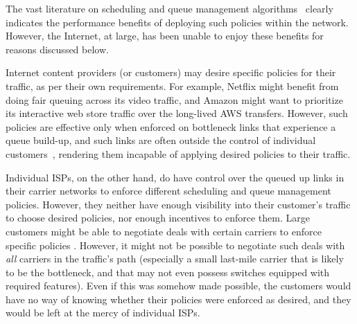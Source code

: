 
The vast literature on scheduling and queue management algorithms~\cite{diffserv, fair-queueing, sfq, pie, CoDel, fifoplus, virtualClocks, csfq, drr, red, ecn} clearly indicates the performance benefits of deploying such policies within the network. However, the Internet, at large, has been unable to enjoy these benefits for reasons discussed below. 

Internet content providers (or customers) may desire specific policies for their traffic, as per their own requirements. For example, Netflix might benefit from doing fair queuing across its video traffic, and Amazon might want to prioritize its interactive web store traffic over the long-lived AWS transfers. However, such policies are effective only when enforced on bottleneck links that experience a queue build-up, and such links are often outside the control of individual customers~\cite{inferring-interdomain-congestion}, rendering them incapable of applying desired policies to their traffic. 

Individual ISPs, on the other hand, do have control over the queued up links in their carrier networks to enforce different scheduling and queue management policies. However, they neither have enough visibility into their customer's traffic to choose desired policies, nor enough incentives to enforce them. Large customers might be able to negotiate deals with certain carriers to enforce specific policies . However, it might not be possible to negotiate such deals with \emph{all} carriers in the traffic's path (especially a small last-mile carrier that is likely to be the bottleneck, and that may not even possess switches equipped with required features). Even if this was somehow made possible, the customers would have no way of knowing whether their policies were enforced as desired, and they would be left at the mercy of individual ISPs.

